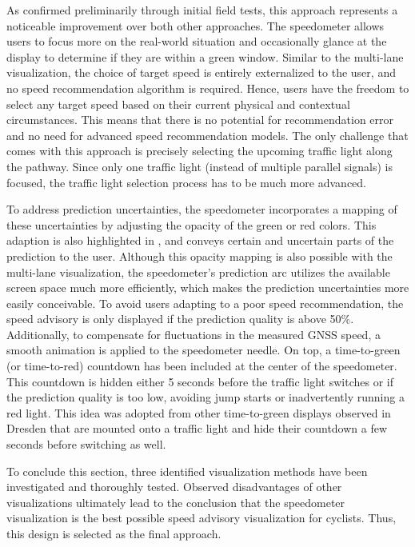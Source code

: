 As confirmed preliminarily through initial field tests, this approach represents a noticeable improvement over both other approaches. The speedometer allows users to focus more on the real-world situation and occasionally glance at the display to determine if they are within a green window. Similar to the multi-lane visualization, the choice of target speed is entirely externalized to the user, and no speed recommendation algorithm is required. Hence, users have the freedom to select any target speed based on their current physical and contextual circumstances. This means that there is no potential for recommendation error and no need for advanced speed recommendation models. The only challenge that comes with this approach is precisely selecting the upcoming traffic light along the pathway. Since only one traffic light (instead of multiple parallel signals) is focused, the traffic light selection process has to be much more advanced.

To address prediction uncertainties, the speedometer incorporates a mapping of these uncertainties by adjusting the opacity of the green or red colors. This adaption is also highlighted in , and conveys certain and uncertain parts of the prediction to the user. Although this opacity mapping is also possible with the multi-lane visualization, the speedometer's prediction arc utilizes the available screen space much more efficiently, which makes the prediction uncertainties more easily conceivable. To avoid users adapting to a poor speed recommendation, the speed advisory is only displayed if the prediction quality is above 50\%. Additionally, to compensate for fluctuations in the measured GNSS speed, a smooth animation is applied to the speedometer needle. On top, a time-to-green (or time-to-red) countdown has been included at the center of the speedometer. This countdown is hidden either 5 seconds before the traffic light switches or if the prediction quality is too low, avoiding jump starts or inadvertently running a red light. This idea was adopted from other time-to-green displays observed in Dresden that are mounted onto a traffic light and hide their countdown a few seconds before switching as well.

To conclude this section, three identified visualization methods have been investigated and thoroughly tested. Observed disadvantages of other visualizations ultimately lead to the conclusion that the speedometer visualization is the best possible speed advisory visualization for cyclists. Thus, this design is selected as the final approach.

